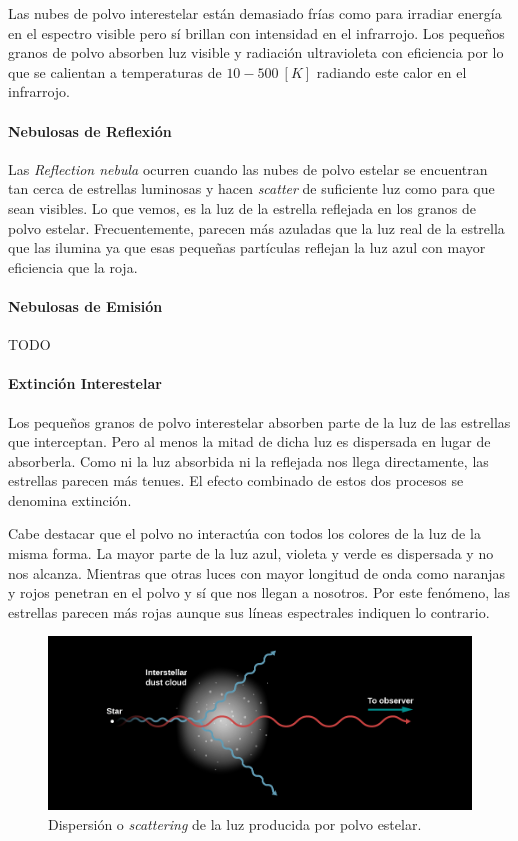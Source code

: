 \documentclass{tufte-handout}
\begin{document}
Las nubes de polvo interestelar están demasiado frías como para irradiar energía en el espectro visible pero sí brillan con intensidad en el infrarrojo. Los pequeños granos de polvo absorben luz visible y radiación ultravioleta con eficiencia por lo que se calientan a temperaturas de $10-500~[K]$ radiando este calor en el infrarrojo.

\paragraph{Nebulosas de Reflexión}

Las \emph{Reflection nebula} ocurren cuando las nubes de polvo estelar se encuentran tan cerca de estrellas luminosas y hacen \emph{scatter} de suficiente luz como para que sean visibles. Lo que vemos, es la luz de la estrella reflejada en los granos de polvo estelar. Frecuentemente, parecen más azuladas que la luz real de la estrella que las ilumina ya que esas pequeñas partículas reflejan la luz azul con mayor eficiencia que la roja.

\paragraph{Nebulosas de Emisión}

TODO

\paragraph{Extinción Interestelar}

Los pequeños granos de polvo interestelar absorben parte de la luz de las estrellas que interceptan. Pero al menos la mitad de dicha luz es dispersada en lugar de absorberla. Como ni la luz absorbida ni la reflejada nos llega directamente, las estrellas parecen más tenues. El efecto combinado de estos dos procesos se denomina extinción.

Cabe destacar que el polvo no interactúa con todos los colores de la luz de la misma forma. La mayor parte de la luz azul, violeta y verde es dispersada y no nos alcanza. Mientras que otras luces con mayor longitud de onda como naranjas y rojos penetran en el polvo y sí que nos llegan a nosotros. Por este fenómeno, las estrellas parecen más rojas aunque sus líneas espectrales indiquen lo contrario.

\begin{figure}
  \includegraphics[width=\linewidth]{img/scatter}
  \caption{Dispersión o \emph{scattering} de la luz producida por polvo estelar.}
\end{figure}
\end{document}
